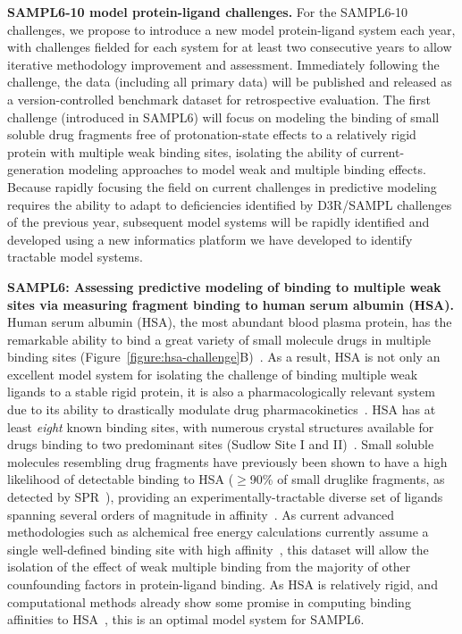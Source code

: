 \documentclass[11pt]{article}
\begin{document}
{\bf SAMPL6-10 model protein-ligand challenges.} 
For the SAMPL6-10 challenges, we propose to introduce a new model protein-ligand system each year, with challenges fielded for each system for at least two consecutive years to allow iterative methodology improvement and assessment.
Immediately following the challenge, the data (including all primary data) will be published and released as a version-controlled benchmark dataset for retrospective evaluation.
The first challenge (introduced in SAMPL6) will focus on modeling the binding of small soluble drug fragments free of protonation-state effects to a relatively rigid protein with multiple weak binding sites, isolating the ability of current-generation modeling approaches to model weak and multiple binding effects.
Because rapidly focusing the field on current challenges in predictive modeling requires the ability to adapt to deficiencies identified by D3R/SAMPL challenges of the previous year, subsequent model systems will be rapidly identified and developed using a new informatics platform we have developed to identify tractable model systems.

{\bf SAMPL6: Assessing predictive modeling of binding to multiple weak sites via measuring fragment binding to human serum albumin (HSA).}
Human serum albumin (HSA), the most abundant blood plasma protein, has the remarkable ability to bind a great variety of small molecule drugs in multiple binding sites (Figure~\ref{figure:hsa-challenge}B)~\cite{Fasano:2005:IUBMBLife(InternationalUnionofBiochemistryandMolecularBiology:Life)}.
As a result, HSA is not only an excellent model system for isolating the challenge of binding multiple weak ligands to a stable rigid protein, it is also a pharmacologically relevant system due to its ability to drastically modulate drug pharmacokinetics~\cite{Hall:2013:JournalofChemicalInformationandModeling}.
HSA has at least \emph{eight} known binding sites, with numerous crystal structures available for drugs binding to two predominant sites (Sudlow Site I and II)~\cite{Hall:2013:JournalofChemicalInformationandModeling}.
Small soluble molecules resembling drug fragments have previously been shown to have a high likelihood of detectable binding to HSA ($\ge$90\% of small druglike fragments, as detected by SPR~\cite{Elinder:2011:JournalofBiomolecularScreening}), providing an experimentally-tractable diverse set of ligands spanning several orders of magnitude in affinity~\cite{Elinder:2011:JournalofBiomolecularScreening}.
As current advanced methodologies such as alchemical free energy calculations currently assume a single well-defined binding site with high affinity~\cite{Gilson:1997:BiophysicalJournal}, this dataset will allow the isolation of the effect of weak multiple binding from the majority of other counfounding factors in protein-ligand binding.
As HSA is relatively rigid, and computational methods already show some promise in computing binding affinities to HSA~\cite{Hall:2013:JournalofChemicalInformationandModeling,Lexa:2014:PLoSONE,Evoli:2016:bioRxiv}, this is an optimal model system for SAMPL6.
\end{document}

